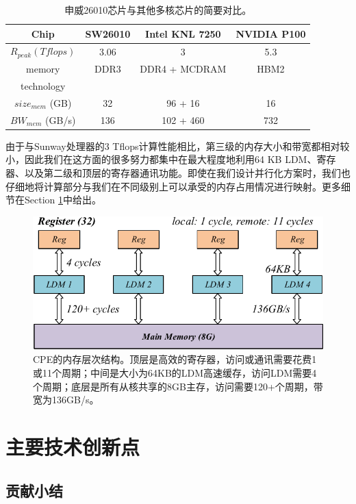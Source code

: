 \documentclass[degree=doctor]{thuthesis}
\begin{document}
\begin{table}[ht]
\caption{申威26010芯片与其他多核芯片的简要对比。}
\label{tb:proc-comp}
\centering
\begin{tabular*}{0.8\columnwidth}{cccc}
\hline\hline
  Chip & SW26010 & Intel KNL 7250 & NVIDIA P100 \\\hline
    $R_{peak} (Tflops)$ & 3.06 & 3 & 5.3 \\\hline
    memory   & DDR3 & DDR4 + MCDRAM & HBM2 \\
    technology \\\hline
    $size_{mem}$ (GB) & 32 & 96 + 16 & 16 \\\hline
    $BW_{mem}$ (GB/s)  & 136 & 102 + 460 & 732 \\\hline
\hline
\end{tabular*}
\end{table}

由于与Sunway处理器的3 Tflops计算性能相比，第三级的内存大小和带宽都相对较小，因此我们在这方面的很多努力都集中在最大程度地利用64 KB LDM、寄存器、以及第二级和顶层的寄存器通讯功能。即使在我们设计并行化方案时，我们也仔细地将计算部分与我们在不同级别上可以承受的内存占用情况进行映射。更多细节在Section \ref{sec:contribution}中给出。

\begin{figure}[ht]
\centering
\includegraphics[width=.9\columnwidth]{memory_hierarchy.pdf}
\caption{CPE的内存层次结构。顶层是高效的寄存器，访问或通讯需要花费1或11个周期；中间是大小为64KB的LDM高速缓存，访问LDM需要4个周期；底层是所有从核共享的8GB主存，访问需要120+个周期，带宽为136GB/s。}
\label{fig:sunway_mem}
\end{figure}

\section{主要技术创新点}
\label{sec:contribution}

\subsection{贡献小结}
\end{document}
